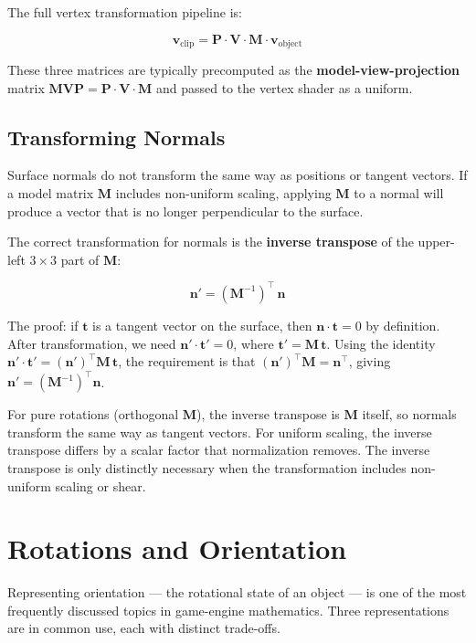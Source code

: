 \documentclass[
  11pt,
  letterpaper,
  DIV=11,
  numbers=noendperiod,
  twoside,
  open=right]{scrreprt}
\begin{document}
The full vertex transformation pipeline is:

\[
\mathbf{v}_{\text{clip}} = \mathbf{P} \cdot \mathbf{V} \cdot \mathbf{M} \cdot \mathbf{v}_{\text{object}}
\]

These three matrices are typically precomputed as the
\textbf{model-view-projection} matrix
\(\mathbf{MVP} = \mathbf{P} \cdot \mathbf{V} \cdot \mathbf{M}\) and
passed to the vertex shader as a uniform.

\subsection{Transforming Normals}\label{transforming-normals}

Surface normals do not transform the same way as positions or tangent
vectors. If a model matrix \(\mathbf{M}\) includes non-uniform scaling,
applying \(\mathbf{M}\) to a normal will produce a vector that is no
longer perpendicular to the surface.

The correct transformation for normals is the \textbf{inverse transpose}
of the upper-left \(3 \times 3\) part of \(\mathbf{M}\):

\[
\mathbf{n}' = (\mathbf{M}^{-1})^\top \, \mathbf{n}
\]

The proof: if \(\mathbf{t}\) is a tangent vector on the surface, then
\(\mathbf{n} \cdot \mathbf{t} = 0\) by definition. After transformation,
we need \(\mathbf{n}' \cdot \mathbf{t}' = 0\), where
\(\mathbf{t}' = \mathbf{M} \, \mathbf{t}\). Using the identity
\(\mathbf{n}' \cdot \mathbf{t}' = (\mathbf{n}')^\top \mathbf{M} \, \mathbf{t}\),
the requirement is that
\((\mathbf{n}')^\top \mathbf{M} = \mathbf{n}^\top\), giving
\(\mathbf{n}' = (\mathbf{M}^{-1})^\top \mathbf{n}\).

For pure rotations (orthogonal \(\mathbf{M}\)), the inverse transpose is
\(\mathbf{M}\) itself, so normals transform the same way as tangent
vectors. For uniform scaling, the inverse transpose differs by a scalar
factor that normalization removes. The inverse transpose is only
distinctly necessary when the transformation includes non-uniform
scaling or shear.

\section{Rotations and Orientation}\label{rotations-and-orientation}

Representing orientation --- the rotational state of an object --- is
one of the most frequently discussed topics in game-engine mathematics.
Three representations are in common use, each with distinct trade-offs.
\end{document}
